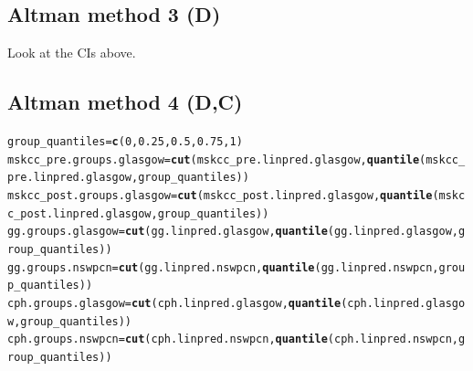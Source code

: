 \documentclass{article}\usepackage[]{graphicx}\usepackage[]{color}
\makeatletter
\newcommand{\hlnum}[1]{\textcolor[rgb]{0.686,0.059,0.569}{#1}}%
\newcommand{\hlstd}[1]{\textcolor[rgb]{0.345,0.345,0.345}{#1}}%
\newcommand{\hlkwb}[1]{\textcolor[rgb]{0.69,0.353,0.396}{#1}}%
\newcommand{\hlkwd}[1]{\textcolor[rgb]{0.737,0.353,0.396}{\textbf{#1}}}%
\newenvironment{kframe}{%
 \def\at@end@of@kframe{}%
 \ifinner\ifhmode%
  \def\at@end@of@kframe{\end{minipage}}%
  \begin{minipage}{\columnwidth}%
 \fi\fi%
 \def\FrameCommand##1{\hskip\@totalleftmargin \hskip-\fboxsep
 \colorbox{shadecolor}{##1}\hskip-\fboxsep
     \hskip-\linewidth \hskip-\@totalleftmargin \hskip\columnwidth}%
 \MakeFramed {\advance\hsize-\width
   \@totalleftmargin\z@ \linewidth\hsize
   \@setminipage}}%
 {\par\unskip\endMakeFramed%
 \at@end@of@kframe}
\newenvironment{knitrout}{}{} %
\makeatother
\begin{document}
\subsection{Altman method 3 (D)}
Look at the CIs above.

\subsection{Altman method 4 (D,C)}
\begin{knitrout}
\color{fgcolor}\begin{kframe}
\begin{alltt}
\hlstd{group_quantiles} \hlkwb{=} \hlkwd{c}\hlstd{(}\hlnum{0}\hlstd{,} \hlnum{0.25}\hlstd{,} \hlnum{0.5}\hlstd{,} \hlnum{0.75}\hlstd{,} \hlnum{1}\hlstd{)}
\hlstd{mskcc_pre.groups.glasgow} \hlkwb{=} \hlkwd{cut}\hlstd{(mskcc_pre.linpred.glasgow,} \hlkwd{quantile}\hlstd{(mskcc_pre.linpred.glasgow, group_quantiles))}
\hlstd{mskcc_post.groups.glasgow} \hlkwb{=} \hlkwd{cut}\hlstd{(mskcc_post.linpred.glasgow,} \hlkwd{quantile}\hlstd{(mskcc_post.linpred.glasgow, group_quantiles))}
\hlstd{gg.groups.glasgow} \hlkwb{=} \hlkwd{cut}\hlstd{(gg.linpred.glasgow,} \hlkwd{quantile}\hlstd{(gg.linpred.glasgow, group_quantiles))}
\hlstd{gg.groups.nswpcn} \hlkwb{=} \hlkwd{cut}\hlstd{(gg.linpred.nswpcn,} \hlkwd{quantile}\hlstd{(gg.linpred.nswpcn, group_quantiles))}
\hlstd{cph.groups.glasgow} \hlkwb{=} \hlkwd{cut}\hlstd{(cph.linpred.glasgow,} \hlkwd{quantile}\hlstd{(cph.linpred.glasgow, group_quantiles))}
\hlstd{cph.groups.nswpcn} \hlkwb{=} \hlkwd{cut}\hlstd{(cph.linpred.nswpcn,} \hlkwd{quantile}\hlstd{(cph.linpred.nswpcn, group_quantiles))}


\end{alltt}
\end{kframe}
\end{knitrout}
\end{document}
